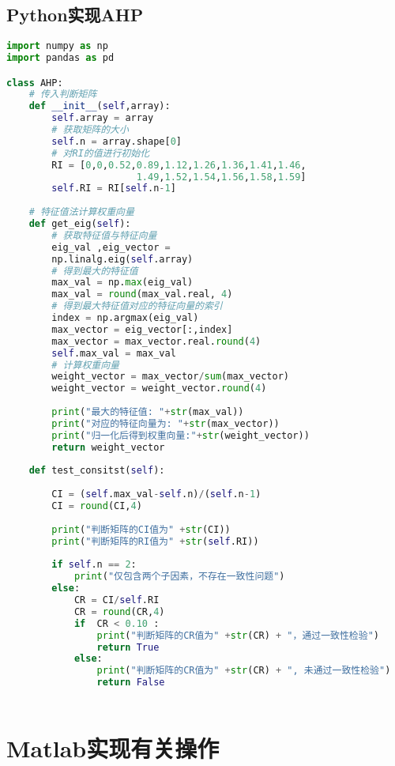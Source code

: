 \documentclass[UTF8]{ctexart}
\begin{document}
\subsection{Python实现AHP}
\begin{lstlisting}[language=Python]
import numpy as np
import pandas as pd

class AHP:
    # 传入判断矩阵
    def __init__(self,array):
        self.array = array   
        # 获取矩阵的大小
        self.n = array.shape[0]
        # 对RI的值进行初始化
        RI = [0,0,0.52,0.89,1.12,1.26,1.36,1.41,1.46, 
                       1.49,1.52,1.54,1.56,1.58,1.59]
        self.RI = RI[self.n-1]
        
    # 特征值法计算权重向量
    def get_eig(self):
        # 获取特征值与特征向量
        eig_val ,eig_vector = 
        np.linalg.eig(self.array)
        # 得到最大的特征值
        max_val = np.max(eig_val)
        max_val = round(max_val.real, 4)
        # 得到最大特征值对应的特征向量的索引
        index = np.argmax(eig_val)
        max_vector = eig_vector[:,index]
        max_vector = max_vector.real.round(4) 
        self.max_val = max_val
        # 计算权重向量
        weight_vector = max_vector/sum(max_vector)
        weight_vector = weight_vector.round(4)
        
        print("最大的特征值: "+str(max_val))
        print("对应的特征向量为: "+str(max_vector))
        print("归一化后得到权重向量:"+str(weight_vector))
        return weight_vector
    
    def test_consitst(self):
       
        CI = (self.max_val-self.n)/(self.n-1) 
        CI = round(CI,4) 
      
        print("判断矩阵的CI值为" +str(CI))
        print("判断矩阵的RI值为" +str(self.RI))
     
        if self.n == 2:
            print("仅包含两个子因素，不存在一致性问题")
        else:
            CR = CI/self.RI 
            CR = round(CR,4)
            if  CR < 0.10 :
                print("判断矩阵的CR值为" +str(CR) + "，通过一致性检验")
                return True
            else:
                print("判断矩阵的CR值为" +str(CR) + ", 未通过一致性检验")
                return False



\end{lstlisting} 


\section{Matlab实现有关操作}
\end{document}
